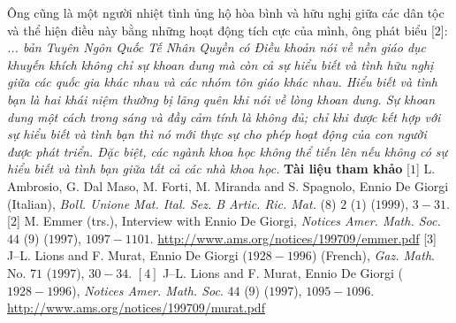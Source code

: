 \begin{multicols}{2}
\begin{figure}[H]
			\vspace*{-15pt}
		\end{figure}
	Ông cũng là một người nhiệt tình ủng hộ hòa bình và hữu nghị giữa các dân tộc và thể hiện điều này bằng những hoạt động tích cực của mình, ông phát biểu [$2$]:
	\vskip 0.1cm
	\textit{... bản Tuyên Ngôn Quốc Tế Nhân Quyền có Điều khoản nói về nền giáo dục khuyến khích không chỉ sự khoan dung mà còn cả sự hiểu biết và tình hữu nghị giữa các quốc gia khác nhau và các nhóm tôn giáo khác nhau. Hiểu biết và tình bạn là hai khái niệm thường bị lãng quên khi nói về lòng khoan dung. Sự khoan dung một cách trong sáng và đầy cảm tính là không đủ; chỉ khi được kết hợp với sự hiểu biết và tình bạn thì nó mới thực sự cho phép hoạt động của con người được phát triển. Đặc biệt, các ngành khoa học không thể tiến lên nếu không có sự hiểu biết và tình bạn giữa tất cả các nhà khoa học.}
	\vskip 0.1cm
	\textbf{\color{quantoan}Tài liệu tham khảo}
	\vskip 0.1cm
	[$1$]	L. Ambrosio, G. Dal Maso, M. Forti, M. Miranda and S. Spagnolo, Ennio De Giorgi (Italian), \textit{Boll. Unione Mat. Ital. Sez. B Artic. Ric. Mat.} ($8$) $2$ ($1$) ($1999$), $3-31$.
	\vskip 0.1cm
	[$2$]	M. Emmer (trs.), Interview with Ennio De Giorgi, \textit{Notices Amer. Math. Soc.} $44$ ($9$) ($1997$), $1097-1101$. \url{http://www.ams.org/notices/199709/emmer.pdf}
	\vskip 0.1cm
	[$3$]	J--L. Lions and F. Murat, Ennio De Giorgi ($1928-1996$) (French), \textit{Gaz. Math}. No. $71$ ($1997$), $30-34$.
	\vskip 0.1cm
	$[4]$	J--L. Lions and F. Murat, Ennio De Giorgi ($1928-1996$), \textit{Notices Amer. Math. Soc}. $44$ ($9$) ($1997$), $1095-1096$. \url{http://www.ams.org/notices/199709/murat.pdf}
\end{multicols}
%
